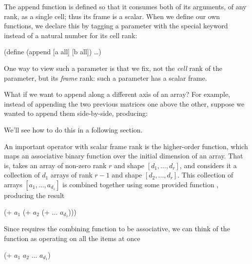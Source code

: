 The append function is defined so that it consumes both of its
arguments, of any rank, as a single cell; thus its frame is a scalar.
When we define our own functions,
we declare this by tagging a parameter with the special keyword 
instead of a natural number for its cell rank:
\begin{code}
    (define (append [a all] [b all]) \ldots)\end{code}
One way to view such a parameter is that we fix,
not the \emph{cell} rank of the parameter, but its \emph{frame} rank:
such a parameter has a scalar frame.

What if we want to append along a different axis of an array?
For example, instead of appending the two previous matrices one above the other,
suppose we wanted to append them side-by-side, producing:
\begin{code}
\result{[[0  1 10 20]
 [2  3 30 40]]}\end{code}
We'll see how to do this in a following section.


An important operator with scalar frame rank is the higher-order 
function,
which maps an associative binary function \ex{+} 
over the initial dimension of an array.
That is,  takes an array of non-zero rank $r$
and shape $[d_1, \ldots, d_r]$, 
and considers it a collection of $d_1$ arrays of rank $r-1$ and
shape $[d_2, \ldots, d_r]$.
This collection of arrays $[a_1, \ldots, a_{d_1}]$ is combined
together using some provided function \ex{+},
producing the result
\begin{code}\cdmath
(+ $a_1$ (+ $a_2$ (+ $\ldots$ $a_{d_1}$)))\end{code}
Since  requires the combining function \ex{+} to be associative,
we can think of the function as operating on all the items at once
\begin{code}\cdmath
(+ $a_1$ $a_2$ $\ldots$ $a_{d_1}$)\end{code}


